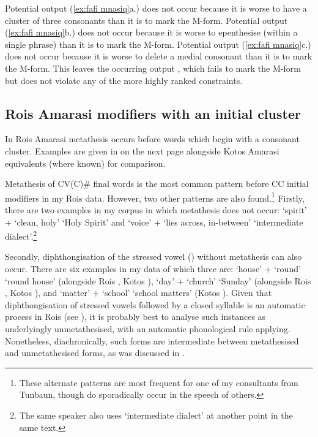 Potential output (\ref{ex:fafi mnasiq}a.) 
does not occur because it is worse to have a cluster of three consonants
than it is to mark the M-form.
Potential output (\ref{ex:fafi mnasiq}b.) 
does not occur because it is worse to epenthesise
(within a single phrase) than it is to mark the M-form.
Potential output (\ref{ex:fafi mnasiq}c.) 
does not occur because it is worse to delete a medial consonant
than it is to mark the M-form.
This leaves the occurring output ,
which fails to mark the M-form but does not violate
any of the more highly ranked constraints.

\subsection{Ro{\Q}is Amarasi modifiers with an initial cluster}\label{sec:RoqAnaCCIniMod}
In Ro{\Q}is Amarasi metathesis occurs before words
which begin with a consonant cluster.
Examples are given in  on the next page
alongside Kotos Amarasi equivalents (where known) for comparison.

Metathesis of CV(C){\#} final words is the most common
pattern before CC initial modifiers in my Ro{\Q}is data.
However, two other patterns are also found.\footnote{
		These alternate patterns are most frequent for
		one of my consultants from Tunbaun,
		though do sporadically occur in the speech of others.}
Firstly, there are two examples in my corpus in
which metathesis does not occur:
 `spirit' +  `clean, holy'
{\ra}  `Holy Spirit'
and  `voice' +  `lies across, in-between'
{\ra}  `intermediate dialect'.\footnote{
		The same speaker also uses  `intermediate dialect'
		at another point in the same text.}

Secondly, diphthongisation of the stressed vowel ()
without metathesis can also occur. There are six examples in my data
of which three are:  `house' +  `round' {\ra}
 `round house'
(alongside Ro{\Q}is , Kotos ),
 `day' +  `church' {\ra}  `Sunday'
(alongside Ro{\Q}is , Kotos ), and
 `matter' +  `school' {\ra} 
`school matters' (Kotos ).
Given that diphthongisation of stressed vowels
followed by a closed syllable is an automatic process
in Ro{\Q}is (see ),
it is probably best to analyse such instances as underlyingly
unmetathesised, with an automatic phonological rule applying.
Nonetheless, diachronically, such forms are intermediate
between metathesised and unmetathesised forms,
as was discussed in .

